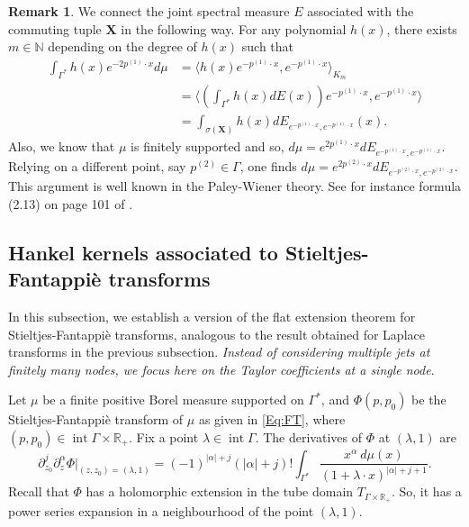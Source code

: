 \documentclass[11pt,reqno]{amsart}
\theoremstyle{plain}
\theoremstyle{definition}
\newtheorem{remark}[theorem]{Remark}
\numberwithin{equation}{section}
\newcommand{\ltt}{\left(}
\newcommand{\rtt}{\right)}
\begin{document}
	\begin{remark}
		We connect the joint spectral measure $E$ associated with the commuting tuple $\mathbf{X}$ in the following way. For any polynomial $h(x)$, there exists $m \in \mathbb{N}$ depending on the degree of $h(x)$ such that
		\begin{align*}
			\int_{\Gamma^*} h(x) e^{-2p^{(1)}\cdot x} d\mu &=\langle h(x) e^{-p^{(1)}\cdot x}, e^{-p^{(1)}\cdot x} \rangle_{K_m}\\
			&= \langle \left(\int_{\Gamma^*} h(x) dE(x) \right) e^{-p^{(1)}\cdot x}, e^{-p^{(1)}\cdot x}  \rangle \\
			&= \int_{\sigma(\mathbf{X})} h(x) dE_{e^{-p^{(1)}\cdot x}, e^{-p^{(1)}\cdot x}}(x).
		\end{align*}
		Also, we know that $\mu$ is finitely supported and so, $d\mu = e^{2p^{(1)} \cdot x} dE_{e^{-p^{(1)}\cdot x}, e^{-p^{(1)}\cdot x}}$. Relying on a different point, say $p^{(2)} \in \Gamma$, one finds
		$d\mu = e^{2p^{(2)} \cdot x} dE_{e^{-p^{(2)}\cdot x}, e^{-p^{(2)}\cdot x}}$.
		This argument is well known in the Paley-Wiener theory. See for instance formula (2.13) on page 101 of \cite{Stein-Weiss}. 
	\end{remark}
	
	
	
	\subsection{Hankel kernels associated to Stieltjes-Fantappi\`e transforms} \label{Subsec:Flat-Fantappie}
	In this subsection, we establish a version of the flat extension theorem for Stieltjes-Fantappi{\`e} transforms, analogous to the result obtained for Laplace transforms in the previous subsection. {\em Instead of considering multiple jets at finitely many nodes, we focus here on the Taylor coefficients at a single node}.  
	
	Let $\mu$ be a finite positive Borel measure supported on $\Gamma^*$, and $\Phi(p,p_0)$ be the Stieltjes-Fantappi{\`e} transform of $\mu$ as given in \eqref{Eq:FT}, where $(p,p_0)\in \operatorname{int} \Gamma \times \mathbb{R}_+$. Fix a point $\lambda \in \operatorname{int}\Gamma$. The derivatives of $\Phi$ at $(\lambda, 1)$ are
    $$
    \partial_{z_0}^j \partial_{z}^\alpha \Phi |_{(z, z_0)=(\lambda, 1)} = (-1)^{|\alpha|+j}(|\alpha|+j)! \int_{\Gamma^*}\frac{x^\alpha \ d\mu(x)}{\ltt1+\lambda\cdot x\rtt^{|\alpha|+j+1}}.
    $$
   Recall that $\Phi$ has a holomorphic extension in the tube domain $T_{\Gamma \times \mathbb{R}_+}$. So, it has a power series expansion in a neighbourhood of the point $(\lambda, 1)$.
   
\end{document}
